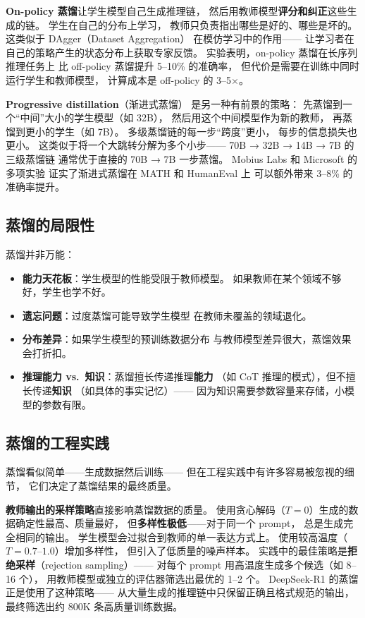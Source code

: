 \textbf{On-policy 蒸馏}让学生模型自己生成推理链，
然后用教师模型\textbf{评分和纠正}这些生成的链。
学生在自己的分布上学习，
教师只负责指出哪些是好的、哪些是坏的。
这类似于 DAgger（Dataset Aggregation）
在模仿学习中的作用——
让学习者在自己的策略产生的状态分布上获取专家反馈。
实验表明，on-policy 蒸馏在长序列推理任务上
比 off-policy 蒸馏提升 5--10\% 的准确率，
但代价是需要在训练中同时运行学生和教师模型，
计算成本是 off-policy 的 3--5$\times$。

\textbf{Progressive distillation}（渐进式蒸馏）
是另一种有前景的策略：
先蒸馏到一个``中间''大小的学生模型（如 32B），
然后用这个中间模型作为新的教师，
再蒸馏到更小的学生（如 7B）。
多级蒸馏链的每一步``跨度''更小，
每步的信息损失也更小。
这类似于将一个大跳转分解为多个小步——
70B → 32B → 14B → 7B 的三级蒸馏链
通常优于直接的 70B → 7B 一步蒸馏。
Mobius Labs 和 Microsoft 的多项实验
证实了渐进式蒸馏在 MATH 和 HumanEval 上
可以额外带来 3--8\% 的准确率提升。

\subsection{蒸馏的局限性}

蒸馏并非万能：
\begin{itemize}[noitemsep]
  \item \textbf{能力天花板}：学生模型的性能受限于教师模型。
        如果教师在某个领域不够好，学生也学不好。
  \item \textbf{遗忘问题}：过度蒸馏可能导致学生模型
        在教师未覆盖的领域退化。
  \item \textbf{分布差异}：如果学生模型的预训练数据分布
        与教师模型差异很大，蒸馏效果会打折扣。
  \item \textbf{推理能力 vs.\ 知识}：蒸馏擅长传递推理\textbf{能力}
        （如 CoT 推理的模式），但不擅长传递\textbf{知识}
        （如具体的事实记忆）——
        因为知识需要参数容量来存储，小模型的参数有限。
\end{itemize}

\subsection{蒸馏的工程实践}

蒸馏看似简单——生成数据然后训练——
但在工程实践中有许多容易被忽视的细节，
它们决定了蒸馏结果的最终质量。

\textbf{教师输出的采样策略}直接影响蒸馏数据的质量。
使用贪心解码（$T = 0$）生成的数据确定性最高、质量最好，
但\textbf{多样性极低}——对于同一个 prompt，
总是生成完全相同的输出。
学生模型会过拟合到教师的单一表达方式上。
使用较高温度（$T = 0.7$--$1.0$）增加多样性，
但引入了低质量的噪声样本。
实践中的最佳策略是\textbf{拒绝采样}（rejection sampling）——
对每个 prompt 用高温度生成多个候选（如 8--16 个），
用教师模型或独立的评估器筛选出最优的 1--2 个。
DeepSeek-R1 的蒸馏正是使用了这种策略——
从大量生成的推理链中只保留正确且格式规范的输出，
最终筛选出约 800K 条高质量训练数据。

